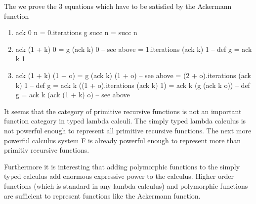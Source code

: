 The we prove the 3 equations which have to be satisfied by the Ackermann
function
\begin{enumerate}
\item
  \begin{alba}
    ack 0 n  = 0.iterations g succ n
             = succ n
  \end{alba}


\item
  \begin{alba}
    ack (1 + k) 0  = g (ack k) 0               -- see above
                   = 1.iterations (ack k) 1    -- def g
                   = ack k 1
  \end{alba}


\item
  \begin{alba}
    ack (1 + k) (1 + o) = g (ack k) (1 + o)             -- see above
                        = (2 + o).iterations (ack k) 1  -- def g
                        = ack k ((1 + o).iterations (ack k) 1)
                        = ack k (g (ack k o))           -- def g
                        = ack k (ack (1 + k) o)         -- see above
  \end{alba}

\end{enumerate}

It seems that the category of primitive recursive functions is not an
important function category in typed lambda calculi. The simply typed lambda
calculus is not powerful enough to represent all primitive recursive
functions. The next more powerful calculus system F is already powerful enough
to represent more than primitiv recursive functions.

Furthermore it is interesting that adding polymorphic functions to the simply
typed calculus add enormous expressive power to the calculus. Higher order
functions (which is standard in any lambda calculus) and polymorphic functions
are sufficient to represent functions like the Ackermann function.



